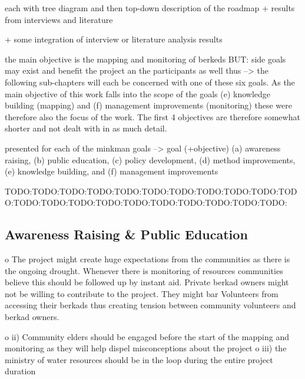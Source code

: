 each with tree diagram %
and then top-down description of the roadmap
+ results from interviews and literature

+ some integration of interview or literature analysis results 

the main objective is the mapping and monitoring of berkeds BUT: side goals may exist and benefit the project an the participants as well %
thus --> the following sub-chapters will each be concerned with one of these six goals. As the main objective of this work falls into the scope of the goals (e) knowledge building (mapping) and (f) management improvements (monitoring) these were therefore also the focus of the work. The first 4 objectives are therefore somewhat shorter and not dealt with in as much detail. %

presented for each of the minkman goals --> goal (+objective)
(a) awareness raising, (b) public education, (c) policy development, (d) method improvements, (e) knowledge building, and (f) management improvements









TODO:TODO:TODO:TODO:TODO:TODO:TODO:TODO:TODO:TODO:TODO:TODO:TODO:TODO:TODO:TODO:TODO:TODO:TODO:TODO:TODO:
\subsection{Awareness Raising \& Public Education}

o	The project might create huge expectations from the communities as there is the ongoing drought. Whenever there is monitoring of resources communities believe this should be followed up by instant aid. Private berkad owners might not be willing to contribute to the project. They might bar Volunteers from accessing their berkads thus creating tension between community volunteers and berkad owners.

o	ii) Community elders should be engaged before the start of the mapping and monitoring as they will help dispel misconceptions about the project
o	iii) the ministry of water resources should be in the loop during the entire project duration

